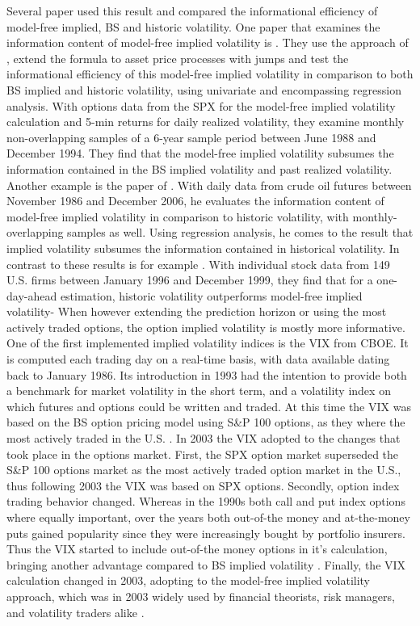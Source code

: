 Several paper used this result and compared the informational efficiency of model-free implied, \ac{BS} and historic volatility. One paper that examines the information content of model-free implied volatility is \textcite{jiang2003}. They use the approach of \textcite{britten2000}, extend the formula to asset price processes with jumps and test the informational efficiency of this model-free implied volatility in comparison to both \ac{BS} implied and historic volatility, using univariate and encompassing regression analysis. With options data from the \ac{SPX} for the model-free implied volatility calculation and 5-min returns for daily realized volatility, they examine monthly non-overlapping samples of a 6-year sample period between June 1988 and December 1994. They find that the model-free implied volatility subsumes the information contained in the \ac{BS} implied volatility and past realized volatility. Another example is the paper of \textcite{bakanova2010}. With daily data from crude oil futures between November 1986 and December 2006, he evaluates the information content of model-free implied volatility in comparison to historic volatility, with monthly-overlapping samples as well. Using regression analysis, he comes to the result that implied volatility subsumes the information contained in historical volatility. In contrast to these results is for example \textcite{taylor2010}. With individual stock data from 149 U.S. firms between January 1996 and December 1999, they find that for a one-day-ahead estimation, historic volatility outperforms model-free implied volatility- When however extending the prediction horizon or using the most actively traded options, the option implied volatility is mostly more informative. \\
One of the first implemented implied volatility indices is the \ac{VIX} from \ac{CBOE}. It is computed each trading day on a real-time basis, with data available dating back to January 1986. Its introduction in 1993 had the intention to provide both a benchmark for market volatility in the short term, and a volatility index on which futures and options could be written and traded. At this time the \ac{VIX} was based on the \ac{BS} option pricing model using S\&P 100 options, as they where the most actively traded in the U.S. \parencite{whaley1995}. In 2003 the \ac{VIX} adopted to the changes that took place in the options market. First, the \ac{SPX} option market superseded the S\&P 100 options market as the most actively traded option market in the U.S., thus following 2003 the \ac{VIX} was based on \ac{SPX} options. Secondly, option index trading behavior changed. Whereas in the 1990s both call and put index options where equally important, over the years both out-of-the money and at-the-money puts gained popularity since they were increasingly bought by portfolio insurers. Thus the \ac{VIX} started to include out-of-the money options in it's calculation, bringing another advantage compared to \ac{BS} implied volatility \parencite{whaley2008}. Finally, the \ac{VIX} calculation changed in 2003, adopting to the model-free implied volatility approach, which was in 2003 widely used by financial theorists, risk managers, and volatility traders alike \parencite{exchange2009}.\\
